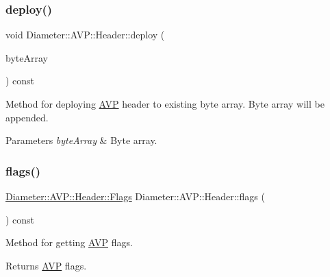 \subsubsection{\texorpdfstring{deploy()}{deploy()}\hspace{0.1cm}{\footnotesize\ttfamily [2/2]}}
{\footnotesize\ttfamily void Diameter\+::\+A\+V\+P\+::\+Header\+::deploy (\begin{DoxyParamCaption}\item[{Byte\+Array \&}]{byte\+Array }\end{DoxyParamCaption}) const}



Method for deploying \hyperlink{classDiameter_1_1AVP}{A\+VP} header to existing byte array. Byte array will be appended. 


\begin{DoxyParams}{Parameters}
{\em byte\+Array} & Byte array. \\
\hline
\end{DoxyParams}
\mbox{\label{classDiameter_1_1AVP_1_1Header_ad100d91021d1db37cc270eefad43ccae}} 
\subsubsection{\texorpdfstring{flags()}{flags()}\hspace{0.1cm}{\footnotesize\ttfamily [1/2]}}
{\footnotesize\ttfamily \hyperlink{classDiameter_1_1AVP_1_1Header_1_1Flags}{Diameter\+::\+A\+V\+P\+::\+Header\+::\+Flags} Diameter\+::\+A\+V\+P\+::\+Header\+::flags (\begin{DoxyParamCaption}{ }\end{DoxyParamCaption}) const}



Method for getting \hyperlink{classDiameter_1_1AVP}{A\+VP} flags. 

\begin{DoxyReturn}{Returns}
\hyperlink{classDiameter_1_1AVP}{A\+VP} flags. 
\end{DoxyReturn}
\mbox{\label{classDiameter_1_1AVP_1_1Header_acbebbb2ad082d7400ee9a0ebf105b55b}} 
